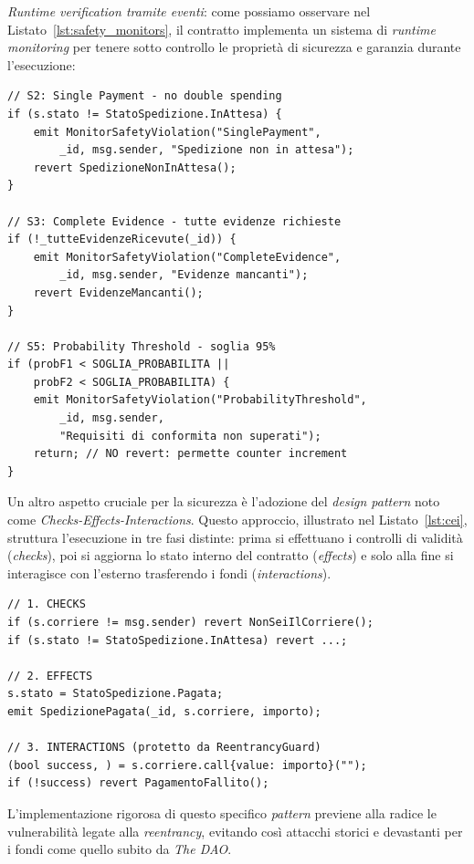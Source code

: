 \textit{Runtime verification tramite eventi}: come possiamo osservare nel Listato~\ref{lst:safety_monitors}, il contratto implementa un sistema di \textit{runtime monitoring} per tenere sotto controllo le proprietà di sicurezza e garanzia durante l'esecuzione:

\begin{lstlisting}[language=Solidity, caption={Safety Monitors}, label=lst:safety_monitors]
// S2: Single Payment - no double spending
if (s.stato != StatoSpedizione.InAttesa) {
    emit MonitorSafetyViolation("SinglePayment", 
        _id, msg.sender, "Spedizione non in attesa");
    revert SpedizioneNonInAttesa();
}

// S3: Complete Evidence - tutte evidenze richieste
if (!_tutteEvidenzeRicevute(_id)) {
    emit MonitorSafetyViolation("CompleteEvidence", 
        _id, msg.sender, "Evidenze mancanti");
    revert EvidenzeMancanti();
}

// S5: Probability Threshold - soglia 95%
if (probF1 < SOGLIA_PROBABILITA || 
    probF2 < SOGLIA_PROBABILITA) {
    emit MonitorSafetyViolation("ProbabilityThreshold",
        _id, msg.sender, 
        "Requisiti di conformita non superati");
    return; // NO revert: permette counter increment
}
\end{lstlisting}

Un altro aspetto cruciale per la sicurezza è l'adozione del \textit{design pattern} noto come \textit{Checks-Effects-Interactions}. Questo approccio, illustrato nel Listato~\ref{lst:cei}, struttura l'esecuzione in tre fasi distinte: prima si effettuano i controlli di validità (\textit{checks}), poi si aggiorna lo stato interno del contratto (\textit{effects}) e solo alla fine si interagisce con l'esterno trasferendo i fondi (\textit{interactions}).



\begin{lstlisting}[language=Solidity, caption={Pattern Checks-Effects-Interactions}, label=lst:cei]
// 1. CHECKS
if (s.corriere != msg.sender) revert NonSeiIlCorriere();
if (s.stato != StatoSpedizione.InAttesa) revert ...;

// 2. EFFECTS
s.stato = StatoSpedizione.Pagata;
emit SpedizionePagata(_id, s.corriere, importo);

// 3. INTERACTIONS (protetto da ReentrancyGuard)
(bool success, ) = s.corriere.call{value: importo}("");
if (!success) revert PagamentoFallito();
\end{lstlisting}

L'implementazione rigorosa di questo specifico \textit{pattern} previene alla radice le vulnerabilità legate alla \textit{reentrancy}, evitando così attacchi storici e devastanti per i fondi come quello subito da \textit{The DAO}.

